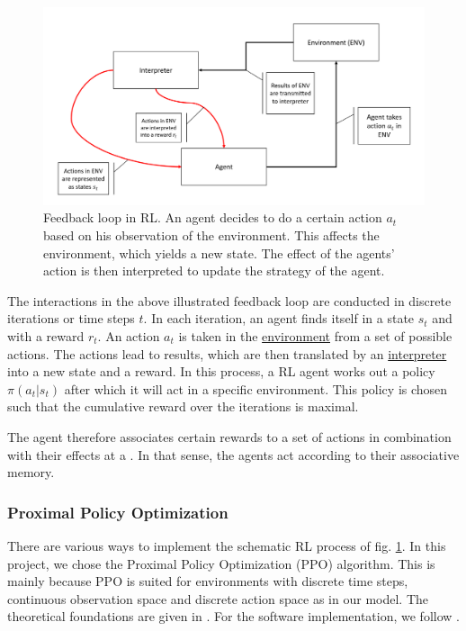 \documentclass[a4paper,12pt]{article} %
\begin{document}
\begin{figure}[H]
    \centering
    \includegraphics[width = 1\textwidth]{RL schematic.PNG}
    \caption{Feedback loop in RL. An agent decides to do a certain action $a_t$ based on his observation of the environment. This affects the environment, which yields a new state. The effect of the agents' action is then interpreted to update the strategy of the agent.}
    \label{fig:RL schematic}
\end{figure}

The interactions in the above illustrated feedback loop are conducted in discrete iterations or time steps $t$. 
In each iteration, an agent finds itself in a state $s_t$ and with a reward $r_t$. An action $a_t$ is taken in the \href{https://n.ethz.ch/~cgolling/gess/html/INFO_RL_env.html}{environment} from a set of possible actions. The actions lead to results, which are then translated by an \href{https://n.ethz.ch/~cgolling/gess/html/INFO_SB3.html}{interpreter} into a new state and a reward. 
In this process, a RL agent works out a policy $\pi(a_t | s_t)$ after which it will act in a specific environment. This policy is chosen such that the cumulative reward over the iterations is maximal. 

The agent therefore associates certain rewards to a set of actions in combination with their effects at a . In that sense, the agents act according to their associative memory. 

\subsubsection{Proximal Policy Optimization}
There are various ways to implement the schematic RL process of fig. \ref{fig:RL schematic}. In this project, we chose the Proximal Policy Optimization (PPO) algorithm. This is mainly because PPO is suited for environments with discrete time steps, continuous observation space and discrete action space as in our model. The theoretical foundations are given in \cite{schulman2017proximal}. For the software implementation, we follow \cite{stable-baselines3}.
\end{document}
